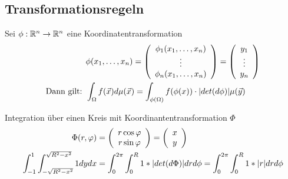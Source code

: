 \documentclass[a4paper]{article}
\begin{document}
% 		
% 


	\subsection{Transformationsregeln}
		\begin{fsatz}[Substitutionsregel]
			Sei $\phi: \mathbb{R}^n \rightarrow \mathbb{R}^n$ eine Koordinatentransformation
			\begin{align*}
				&\phi(x_1, \ldots, x_n) = \left( \begin{array}{c} \phi_1(x_1, \ldots, x_n)\\ \vdots \\ \phi_n(x_1, \ldots, x_n) \end{array} \right) = \left( \begin{array}{c} y_1 \\ \vdots \\ y_n \end{array} \right)\\
				\text{Dann gilt:  }& \int_\Omega f(\vec x) d\mu( \vec x) = \int_{\phi(\Omega)} f(\phi(x)) \cdot |det(d \phi)|\mu(\vec y)
			\end{align*}

		\end{fsatz}
		\begin{fmerke}
			Integration über einen Kreis mit Koordinantentransformation $\Phi$
			\begin{align*}
				\Phi(r,\varphi) &= \left( \begin{array}{c} r \cos \varphi \\ r \sin \varphi \end{array} \right) = \left( \begin{array}{c} x \\ y \end{array} \right)\\
				\int_{-1}^{1} \int_{-\sqrt{R^2-x^2}}^{\sqrt{R^2-x^2}} 1 dydx &= \int_0^{2 \pi} \int_0^R 1 * |det(d\Phi)| dr d \phi = \int_0^{2 \pi} \int_0^R 1 * |r| dr d \phi
			\end{align*}
		\end{fmerke}
	
\end{document}
